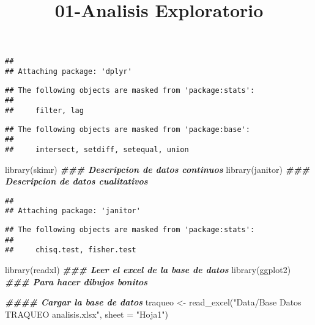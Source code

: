 \documentclass[
]{article}
\title{01-Analisis Exploratorio}
\author{}
\date{\vspace{-2.5em}}
\newenvironment{Shaded}{\begin{snugshade}}{\end{snugshade}}
\newcommand{\AttributeTok}[1]{\textcolor[rgb]{0.77,0.63,0.00}{#1}}
\newcommand{\ConstantTok}[1]{\textcolor[rgb]{0.00,0.00,0.00}{#1}}
\newcommand{\DocumentationTok}[1]{\textcolor[rgb]{0.56,0.35,0.01}{\textbf{\textit{#1}}}}
\newcommand{\FunctionTok}[1]{\textcolor[rgb]{0.00,0.00,0.00}{#1}}
\newcommand{\NormalTok}[1]{#1}
\newcommand{\OtherTok}[1]{\textcolor[rgb]{0.56,0.35,0.01}{#1}}
\newcommand{\SpecialCharTok}[1]{\textcolor[rgb]{0.00,0.00,0.00}{#1}}
\newcommand{\StringTok}[1]{\textcolor[rgb]{0.31,0.60,0.02}{#1}}
\begin{document}
\maketitle

\begin{Shaded}
\end{Shaded}

\begin{verbatim}
## 
## Attaching package: 'dplyr'
\end{verbatim}

\begin{verbatim}
## The following objects are masked from 'package:stats':
## 
##     filter, lag
\end{verbatim}

\begin{verbatim}
## The following objects are masked from 'package:base':
## 
##     intersect, setdiff, setequal, union
\end{verbatim}

\begin{Shaded}
\begin{Highlighting}[]
\FunctionTok{library}\NormalTok{(skimr) }\DocumentationTok{\#\#\# Descripcion de datos continuos}
\FunctionTok{library}\NormalTok{(janitor) }\DocumentationTok{\#\#\# Descripcion de datos cualitativos}
\end{Highlighting}
\end{Shaded}

\begin{verbatim}
## 
## Attaching package: 'janitor'
\end{verbatim}

\begin{verbatim}
## The following objects are masked from 'package:stats':
## 
##     chisq.test, fisher.test
\end{verbatim}

\begin{Shaded}
\begin{Highlighting}[]
\FunctionTok{library}\NormalTok{(readxl) }\DocumentationTok{\#\#\# Leer el excel de la base de datos}
\FunctionTok{library}\NormalTok{(ggplot2) }\DocumentationTok{\#\#\# Para hacer dibujos bonitos}


\DocumentationTok{\#\#\#\# Cargar la base de datos}
\NormalTok{traqueo }\OtherTok{\textless{}{-}} \FunctionTok{read\_excel}\NormalTok{(}\StringTok{"Data/Base Datos TRAQUEO analisis.xlsx"}\NormalTok{, }
                                          \AttributeTok{sheet =} \StringTok{"Hoja1"}\NormalTok{)}
\end{Highlighting}
\end{Shaded}
\end{document}
